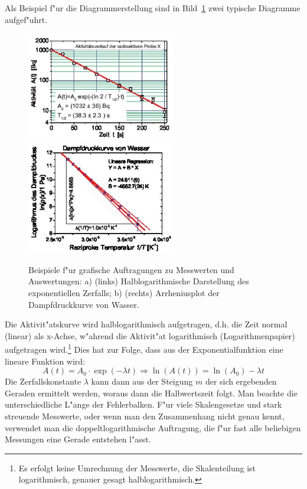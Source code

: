Als Beispiel f"ur die Diagrammerstellung sind in
Bild~\ref{a:graph_beisp} zwei typische Diagramme aufgef"uhrt.
%
\begin{figure}[htb]
  \centering
  \includegraphics[width=6.5cm]{00_einl/graph_expzerf}
  \includegraphics[width=6.5cm]{00_einl/graph_dampf}
  \caption[Diagramm-Beispiele]{\label{a:graph_beisp}Beispiele f"ur grafische Auftragungen
   zu Messwerten und Auswertungen:
  a) (links) Halblogarithmische Darstellung des exponentiellen Zerfalls;
  b) (rechts) Arrheniusplot der Dampfdruckkurve von Wasser. }
\end{figure}
%
Die Aktivit"atskurve wird
halblogarithmisch
aufgetragen, d.h. die Zeit normal (linear) als x-Achse, w"ahrend
die Aktivit"at logarithmisch
(Logarithmenpapier) aufgetragen
wird.\footnote{Es erfolgt keine Umrechnung der Messwerte, die
Skalenteilung ist logarithmisch, genauer gesagt
halblogarithmisch.} Dies hat zur Folge, dass aus der
Exponentialfunktion eine lineare Funktion wird:
%
\begin{equation}\label{e:bsp_exp}
    A(t)=A_0 \cdot \exp(-\lambda t) \Longrightarrow \ln(A(t)) =
    \ln(A_0) - \lambda t
\end{equation}
%
Die Zerfallskonstante $\lambda$ kann dann aus der Steigung $m$ der
sich ergebenden Geraden ermittelt werden, woraus dann die
Halbwertszeit folgt. Man beachte die unterschiedliche L"ange der
Fehlerbalken. F"ur viele Skalengesetze und stark streuende Messwerte,
oder wenn man den Zusammenhang nicht genau kennt, verwendet man die
doppeltlogarithmische
Auftragung, die f"ur
fast alle beliebigen Messungen eine Gerade entstehen l"asst.

